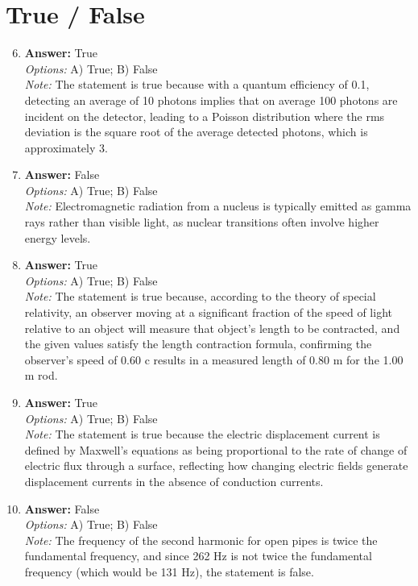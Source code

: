 \documentclass[12pt]{article}
\begin{document}
\section*{True / False}
\begin{enumerate}[label=\arabic*.]
\setcounter{enumi}{5}
\item \textbf{Answer:} True
\\ \textit{Options:} A) True; B) False
\\ \textit{Note:} The statement is true because with a quantum efficiency of 0.1, detecting an average of 10 photons implies that on average 100 photons are incident on the detector, leading to a Poisson distribution where the rms deviation is the square root of the average detected photons, which is approximately 3.
\item \textbf{Answer:} False
\\ \textit{Options:} A) True; B) False
\\ \textit{Note:} Electromagnetic radiation from a nucleus is typically emitted as gamma rays rather than visible light, as nuclear transitions often involve higher energy levels.
\item \textbf{Answer:} True
\\ \textit{Options:} A) True; B) False
\\ \textit{Note:} The statement is true because, according to the theory of special relativity, an observer moving at a significant fraction of the speed of light relative to an object will measure that object's length to be contracted, and the given values satisfy the length contraction formula, confirming the observer's speed of 0.60 c results in a measured length of 0.80 m for the 1.00 m rod.
\item \textbf{Answer:} True
\\ \textit{Options:} A) True; B) False
\\ \textit{Note:} The statement is true because the electric displacement current is defined by Maxwell's equations as being proportional to the rate of change of electric flux through a surface, reflecting how changing electric fields generate displacement currents in the absence of conduction currents.
\item \textbf{Answer:} False
\\ \textit{Options:} A) True; B) False
\\ \textit{Note:} The frequency of the second harmonic for open pipes is twice the fundamental frequency, and since 262 Hz is not twice the fundamental frequency (which would be 131 Hz), the statement is false.
\end{enumerate}
\end{document}
